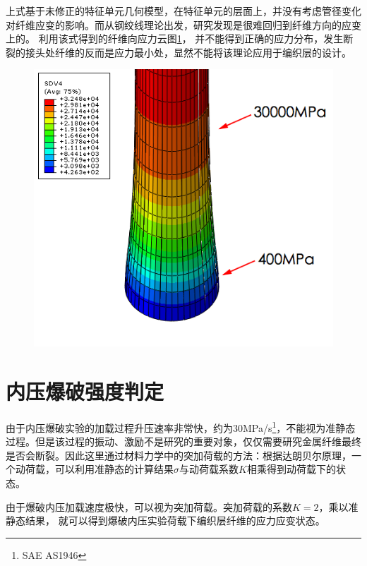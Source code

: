 上式基于未修正的特征单元几何模型，在特征单元的层面上，并没有考虑管径变化对纤维应变的影响。而从钢绞线理论出发，研究发现是很难回归到纤维方向的应变上的。
利用该式得到的纤维向应力云图\ref{fig:hose-strength002}， 
并不能得到正确的应力分布，发生断裂的接头处纤维的反而是应力最小处，显然不能将该理论应用于编织层的设计。
\begin{figure}[!htp]
	\centering
	\includegraphics[height=0.26\textheight]{figure/chap6/hose-strength002}
	\label{fig:hose-strength002}
\end{figure}

 






\section{内压爆破强度判定}

由于内压爆破实验的加载过程升压速率非常快，约为30MPa/s\footnote{SAE AS1946}，不能视为准静态过程。但是该过程的振动、激励不是研究的重要对象，仅仅需要研究金属纤维最终是否会断裂。因此这里通过材料力学中的突加荷载的方法：根据达朗贝尔原理，一个动荷载，可以利用准静态的计算结果$ \sigma $与动荷载系数$ K $相乘得到动荷载下的状态。

由于爆破内压加载速度极快，可以视为突加荷载。突加荷载的系数$ K=2 $，乘以准静态结果，
就可以得到爆破内压实验荷载下编织层纤维的应力应变状态。



